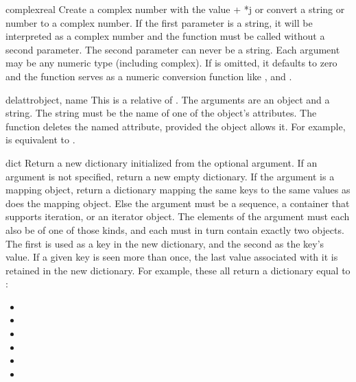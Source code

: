 \begin{funcdesc}{complex}{real}
  Create a complex number with the value  + *j or
  convert a string or number to a complex number.  If the first
  parameter is a string, it will be interpreted as a complex number
  and the function must be called without a second parameter.  The
  second parameter can never be a string.
  Each argument may be any numeric type (including complex).
  If  is omitted, it defaults to zero and the function
  serves as a numeric conversion function like ,
   and .
\end{funcdesc}

\begin{funcdesc}{delattr}{object, name}
  This is a relative of .  The arguments are an
  object and a string.  The string must be the name
  of one of the object's attributes.  The function deletes
  the named attribute, provided the object allows it.  For example,
   is equivalent to
  .
\end{funcdesc}

\begin{funcdesc}{dict}{}
  Return a new dictionary initialized from the optional argument.
  If an argument is not specified, return a new empty dictionary.
  If the argument is a mapping object, return a dictionary mapping the
  same keys to the same values as does the mapping object.
  Else the argument must be a sequence, a container that supports
  iteration, or an iterator object.  The elements of the argument must
  each also be of one of those kinds, and each must in turn contain
  exactly two objects.  The first is used as a key in the new dictionary,
  and the second as the key's value.  If a given key is seen more than
  once, the last value associated with it is retained in the new
  dictionary.
  For example, these all return a dictionary equal to
  :

  \begin{itemize}
    \item {}
    \item {}
    \item {}
    \item {}
    \item {}
    \item {}
  \end{itemize}

\end{funcdesc}

